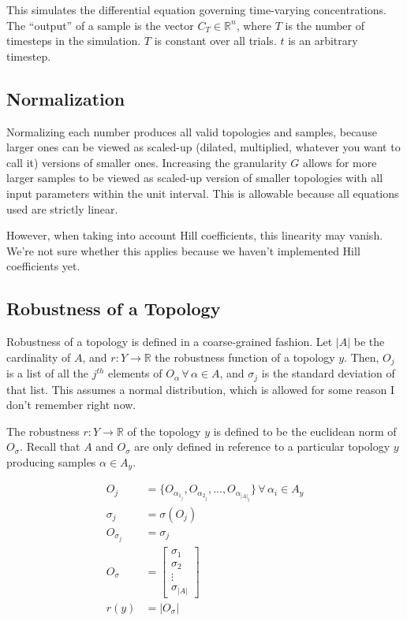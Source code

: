 \documentclass{article}
\begin{document}
This simulates the differential equation governing time-varying concentrations. The ``output'' of a sample is the vector $C_T \in \mathbb{R}^n$, where $T$ is the number of timesteps in the simulation. $T$ is constant over all trials. $t$ is an arbitrary timestep.

\subsection{Normalization}

Normalizing each number produces all valid topologies and samples, because larger ones can be viewed as scaled-up (dilated, multiplied, whatever you want to call it) versions of smaller ones. Increasing the granularity $G$ allows for more larger samples to be viewed as scaled-up version of smaller topologies with all input parameters within the unit interval. This is allowable because all equations used are strictly linear.

However, when taking into account Hill coefficients, this linearity may vanish. We're not sure whether this applies because we haven't implemented Hill coefficients yet.

\subsection{Robustness of a Topology}

Robustness of a topology is defined in a coarse-grained fashion. Let $\lvert A \rvert$ be the cardinality of $A$, and $r : Y \to \mathbb{R}$ the robustness function of a topology $y$. Then, $O_j$ is a list of all the $j^{th}$ elements of $O_\alpha \,\forall\, \alpha \in A$, and $\sigma_j$ is the standard deviation of that list. This assumes a normal distribution, which is allowed for some reason I don't remember right now.

The robustness $r : Y \to \mathbb{R}$ of the topology $y$ is defined to be the euclidean norm of $O_\sigma$. Recall that $A$ and $O_\sigma$ are only defined in reference to a particular topology $y$ producing samples $\alpha \in A_y$.

\begin{align}
  O_j &= \{O_{\alpha_{1_j}}, O_{\alpha_{2_j}}, ..., O_{\alpha_{\lvert A \rvert_j}}\} \,\forall\, \alpha_i \in A_y \\
  \sigma_j &= \sigma(O_j) \\
  O_{\sigma_j} &= \sigma_j \\
  O_\sigma &=
             \begin{bmatrix}
               \sigma_1 \\ \sigma_2 \\ \vdots \\ \sigma_{\lvert A \rvert}
             \end{bmatrix} \\
  r(y) &= \lvert O_\sigma \rvert
\end{align}
\end{document}

